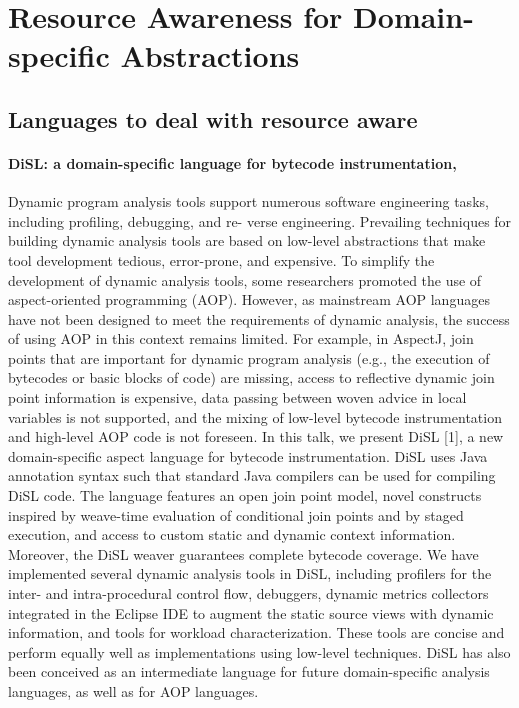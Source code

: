 \section{Resource Awareness for Domain-specific Abstractions} \label{sec:resource-awareness-for-dsl}

\subsection{Languages to deal with resource aware}

\paragraph{DiSL: a domain-specific language for bytecode instrumentation, \cite{Marek:2012:DEL:2162037.2162046,Marek2012}}
Dynamic program analysis tools support numerous software engineering tasks, including profiling, debugging, and re-
verse engineering.
Prevailing techniques for building dynamic analysis tools are based on low-level abstractions
that make tool development tedious, error-prone, and expensive. To simplify the development of dynamic analysis tools,
some researchers promoted the use of aspect-oriented programming (AOP). However, as mainstream AOP languages
have not been designed to meet the requirements of dynamic analysis, the success of using AOP in this context remains
limited. For example, in AspectJ, join points that are important for dynamic program analysis (e.g., the execution of
bytecodes or basic blocks of code) are missing, access to reflective dynamic join point information is expensive, data
passing between woven advice in local variables is not supported, and the mixing of low-level bytecode instrumentation
and high-level AOP code is not foreseen. In this talk, we present DiSL [1], a new domain-specific aspect language for
bytecode instrumentation.
DiSL uses Java annotation syntax such that standard Java compilers can be used for compiling
DiSL code. The language features an open join point model, novel constructs inspired by weave-time evaluation of
conditional join points and by staged execution, and access to custom static and dynamic context information.
Moreover, the DiSL weaver guarantees complete bytecode coverage.
We have implemented several dynamic analysis tools in DiSL,
including profilers for the inter- and intra-procedural control
flow, debuggers, dynamic metrics collectors integrated in the
Eclipse IDE to augment the static source views with dynamic information, and tools for workload characterization.
These tools are concise and perform equally well as implementations using low-level techniques. DiSL has also been
conceived as an intermediate language for future domain-specific analysis languages, as well as for AOP languages.


